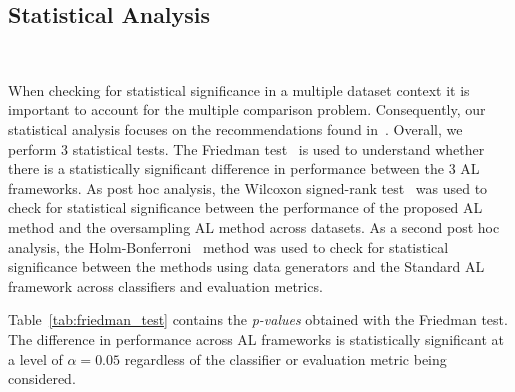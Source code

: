 \documentclass[parskip=full]{scrartcl}
\begin{document}


\subsection{Statistical Analysis}~\label{sec:statistical-analysis}

When checking for statistical significance in a multiple dataset context it is
important to account for the multiple comparison problem. Consequently, our
statistical analysis focuses on the recommendations found
in~\cite{Demsar2006}. Overall, we perform 3 statistical tests. The Friedman
test~\cite{Friedman1937} is used to understand whether there is a
statistically significant difference in performance between the 3 AL
frameworks. As post hoc analysis, the Wilcoxon signed-rank
test~\cite{Wilcoxon1945} was used to check for statistical significance
between the performance of the proposed AL method and the oversampling AL
method across datasets. As a second post hoc analysis, the
Holm-Bonferroni~\cite{Holm1979} method was used to check for statistical
significance between the methods using data generators and the Standard AL
framework across classifiers and evaluation metrics.

Table~\ref{tab:friedman_test} contains the \textit{p-values} obtained with the
Friedman test. The difference in performance across AL frameworks is
statistically significant at a level of $\alpha = 0.05$ regardless of the
classifier or evaluation metric being considered.

\begin{table}[H]
	\centering
    \caption{%
        Results for Friedman test. Statistical significance is tested at a
        level of $\alpha = 0.05$. The null hypothesis is that there is no
        difference in the classification outcome across oversamplers.
    }\label{tab:friedman_test}
\end{table}
\end{document}
